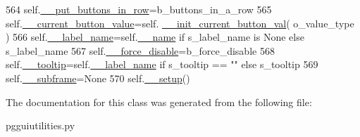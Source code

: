 \begin{DoxyCode}
564         self.\hyperlink{classnegui_1_1pgguiutilities_1_1KeyCategoricalValueFrame_a869087c9cc908de0226eec78cb4282bb}{\_\_put\_buttons\_in\_row}=b\_buttons\_in\_a\_row
565         self.\hyperlink{classnegui_1_1pgguiutilities_1_1KeyCategoricalValueFrame_aa1bb987386f2e559c6de976b745f185e}{\_\_current\_button\_value}=self.
      \hyperlink{classnegui_1_1pgguiutilities_1_1KeyCategoricalValueFrame_ab1e309b3e63c5c4a57d37d2a61f4e90d}{\_\_init\_current\_button\_val}( o\_value\_type )
566         self.\hyperlink{classnegui_1_1pgguiutilities_1_1KeyCategoricalValueFrame_a3a453ac47871c2f8b894442fd3ef5d07}{\_\_label\_name}=self.\hyperlink{classnegui_1_1pgguiutilities_1_1KeyCategoricalValueFrame_a92a1947d6110ada3bd813cc8e84d84ad}{\_\_name} \textcolor{keywordflow}{if} s\_label\_name \textcolor{keywordflow}{is} \textcolor{keywordtype}{None} \textcolor{keywordflow}{else} s\_label\_name
567         self.\hyperlink{classnegui_1_1pgguiutilities_1_1KeyCategoricalValueFrame_a01ea2795b9136b4fab5d6fe78dc2947d}{\_\_force\_disable}=b\_force\_disable
568         self.\hyperlink{classnegui_1_1pgguiutilities_1_1KeyCategoricalValueFrame_ae2f1424ab33f1ff0c9477dcf401748ca}{\_\_tooltip}=self.\hyperlink{classnegui_1_1pgguiutilities_1_1KeyCategoricalValueFrame_a3a453ac47871c2f8b894442fd3ef5d07}{\_\_label\_name} \textcolor{keywordflow}{if} s\_tooltip == \textcolor{stringliteral}{""} \textcolor{keywordflow}{else} s\_tooltip
569         self.\hyperlink{classnegui_1_1pgguiutilities_1_1KeyCategoricalValueFrame_ad2350dd7438d98d077c86e8295425ca0}{\_\_subframe}=\textcolor{keywordtype}{None}
570         self.\hyperlink{classnegui_1_1pgguiutilities_1_1KeyCategoricalValueFrame_a1e890256208ab06e21db468c7aed6bd8}{\_\_setup}()
\end{DoxyCode}


The documentation for this class was generated from the following file\+:\begin{DoxyCompactItemize}
\item 
pgguiutilities.\+py\end{DoxyCompactItemize}
